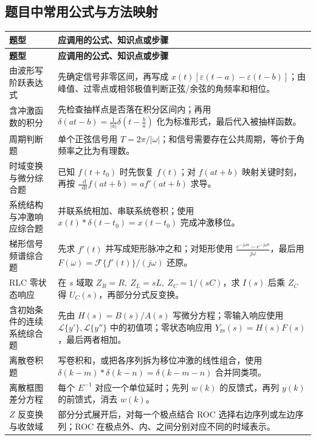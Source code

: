 \documentclass[12pt,a4paper]{ctexart}
\newcommand{\eps}{\varepsilon}
\newcommand{\dif}{\mathop{}\!\mathrm{d}}
\begin{document}
\subsection{题目中常用公式与方法映射}
\begin{longtable}{p{}p{}}
\toprule
\textbf{题型} & \textbf{应调用的公式、知识点或步骤}\\
\midrule
\endfirsthead
\toprule
\textbf{题型} & \textbf{应调用的公式、知识点或步骤}\\
\midrule
\endhead
由波形写阶跃表达式 & 先确定信号非零区间，再写成 \(\displaystyle x(t)[\eps(t-a)-\eps(t-b)]\)；由峰值、过零点或相邻极值判断正弦/余弦的角频率和相位。\\
含冲激函数的积分 & 先检查抽样点是否落在积分区间内；再用 \(\displaystyle \delta(at-b)=\frac1{|a|}\delta\left(t-\frac ba\right)\) 化为标准形式，最后代入被抽样函数。\\
周期判断题 & 单个正弦信号用 \(\displaystyle T=2\pi/|\omega|\)；和信号需要存在公共周期，等价于角频率之比为有理数。\\
时域变换与微分综合题 & 已知 $f(t+t_0)$ 时先恢复 $f(t)$；对 \(\displaystyle f(at+b)\) 映射关键时刻，再按 \(\displaystyle \frac{\dif}{\dif t}f(at+b)=af'(at+b)\) 求导。\\
系统结构与冲激响应综合题 & 并联系统相加、串联系统卷积；使用 \(\displaystyle x(t)*\delta(t-t_0)=x(t-t_0)\) 完成冲激移位。\\
梯形信号频谱综合题 & 先求 $f'(t)$ 并写成矩形脉冲之和；对矩形使用 \(\displaystyle \frac{e^{-j\omega a}-e^{-j\omega b}}{j\omega}\)，最后用 \(\displaystyle F(\omega)=\mathcal F\{f'(t)\}/(j\omega)\) 还原。\\
RLC 零状态响应 & 在 $s$ 域取 \(\displaystyle Z_R=R,\ Z_L=sL,\ Z_C=1/(sC)\)，求 \(\displaystyle I(s)\) 后乘 $Z_C$ 得 $U_C(s)$，再部分分式反变换。\\
含初始条件的连续系统综合题 & 先由 $H(s)=B(s)/A(s)$ 写微分方程；零输入响应使用 \(\displaystyle \mathcal L\{y'\},\mathcal L\{y''\}\) 中的初值项；零状态响应用 \(\displaystyle Y_{\mathrm{zs}}(s)=H(s)F(s)\)，最后两者相加。\\
离散卷积题 & 写卷积和，或把各序列拆为移位冲激的线性组合，使用 \(\displaystyle \delta(k-m)*\delta(k-n)=\delta(k-m-n)\) 合并同类项。\\
离散框图差分方程 & 每个 $E^{-1}$ 对应一个单位延时；先列 $w(k)$ 的反馈式，再列 $y(k)$ 的前馈式，消去 $w(k)$。\\
$Z$ 反变换与收敛域 & 部分分式展开后，对每一个极点结合 ROC 选择右边序列或左边序列；ROC 在极点外、内、之间分别对应不同的时域表示。\\
\bottomrule
\end{longtable}
\end{document}

